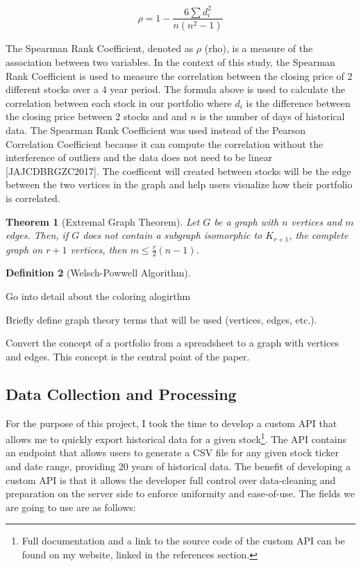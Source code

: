 \documentclass{article}
\newtheorem{theorem}{Theorem}[section]
\newtheorem{definition}[theorem]{Definition}
\begin{document}
\[
\rho = 1 - \frac{6 \sum d_i^2}{n(n^2-1)}
\]

The Spearman Rank Coefficient, denoted as $\rho$ (rho), is a measure of the association between two variables. In the context of this study, the Spearman Rank Coefficient is used to measure the correlation between the closing price of 2 different stocks over a 4 year period. The formula above is used to calculate the correlation between each stock in our portfolio where $d_i$ is the difference between the closing price between 2 stocks and and $n$ is the number of days of historical data. The Spearman Rank Coefficient was used instead of the Pearson Correlation Coefficient because it can compute the correlation without the interference of outliers and the data does not need to be linear [JAJCDBRGZC2017]. The coefficent will created between stocks will be the edge between the two vertices in the graph and help users visualize how their portfolio is correlated. 


\begin{theorem}[Extremal Graph Theorem]
    Let $G$ be a graph with $n$ vertices and $m$ edges. Then, if $G$ does not contain a subgraph isomorphic to $K_{r+1}$, the complete graph on $r+1$ vertices, then $m \leq \frac{r}{2}(n-1)$.
\end{theorem}




\begin{definition}[Welsch-Powwell Algorithm]
\end{definition}

Go into detail about the coloring alogirthm



Briefly define graph theory terms that will be used (vertices, edges, etc.). 


Convert the concept of a portfolio from a spreadsheet to a graph with vertices and edges. This concept is the central point of the paper.


\subsection{Data Collection and Processing}

For the purpose of this project, I took the time to develop a custom API that allows me to quickly export historical data for a given stock\footnote{Full documentation and a link to the source code of the custom API can be found on my website, linked in the references section.}. The API contains an endpoint that allows users to generate a CSV file for any given stock ticker and date range, providing 20 years of historical data. The benefit of developing a custom API is that it allows the developer full control over data-cleaning and preparation on the server side to enforce uniformity and ease-of-use. The fields we are going to use are as follows:
\end{document}
